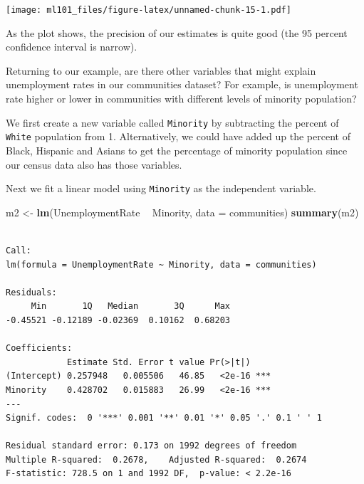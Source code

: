 \documentclass[]{article}
\newenvironment{Shaded}{\begin{snugshade}}{\end{snugshade}}
\newcommand{\DataTypeTok}[1]{\textcolor[rgb]{0.13,0.29,0.53}{#1}}
\newcommand{\DecValTok}[1]{\textcolor[rgb]{0.00,0.00,0.81}{#1}}
\newcommand{\KeywordTok}[1]{\textcolor[rgb]{0.13,0.29,0.53}{\textbf{#1}}}
\newcommand{\NormalTok}[1]{#1}
\newcommand{\OperatorTok}[1]{\textcolor[rgb]{0.81,0.36,0.00}{\textbf{#1}}}
\newcommand{\StringTok}[1]{\textcolor[rgb]{0.31,0.60,0.02}{#1}}
\begin{document}
\texttt{[image: ml101\_files/figure-latex/unnamed-chunk-15-1.pdf]}

As the plot shows, the precision of our estimates is quite good (the 95 percent confidence interval is narrow).

Returning to our example, are there other variables that might explain unemployment rates in our communities dataset? For example, is unemployment rate higher or lower in communities with different levels of minority population?

We first create a new variable called \texttt{Minority} by subtracting the percent of \texttt{White} population from 1. Alternatively, we could have added up the percent of Black, Hispanic and Asians to get the percentage of minority population since our census data also has those variables.

\begin{Shaded}
\end{Shaded}

Next we fit a linear model using \texttt{Minority} as the independent variable.

\begin{Shaded}
\begin{Highlighting}[]
\NormalTok{m2 <-}\StringTok{ }\KeywordTok{lm}\NormalTok{(UnemploymentRate }\OperatorTok{~}\StringTok{ }\NormalTok{Minority, }\DataTypeTok{data =}\NormalTok{ communities)}
\KeywordTok{summary}\NormalTok{(m2)}
\end{Highlighting}
\end{Shaded}

\begin{verbatim}

Call:
lm(formula = UnemploymentRate ~ Minority, data = communities)

Residuals:
     Min       1Q   Median       3Q      Max 
-0.45521 -0.12189 -0.02369  0.10162  0.68203 

Coefficients:
            Estimate Std. Error t value Pr(>|t|)    
(Intercept) 0.257948   0.005506   46.85   <2e-16 ***
Minority    0.428702   0.015883   26.99   <2e-16 ***
---
Signif. codes:  0 '***' 0.001 '**' 0.01 '*' 0.05 '.' 0.1 ' ' 1

Residual standard error: 0.173 on 1992 degrees of freedom
Multiple R-squared:  0.2678,    Adjusted R-squared:  0.2674 
F-statistic: 728.5 on 1 and 1992 DF,  p-value: < 2.2e-16
\end{verbatim}
\end{document}
